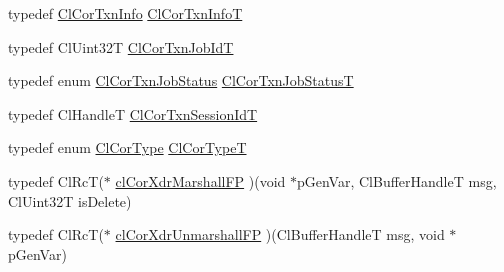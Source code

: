 \begin{CompactItemize}
\item 
typedef \hyperlink{struct_cl_cor_txn_info}{Cl\-Cor\-Txn\-Info} \hyperlink{group__group13_ga40}{Cl\-Cor\-Txn\-Info\-T}
\item 
typedef Cl\-Uint32T \hyperlink{group__group13_ga18}{Cl\-Cor\-Txn\-Job\-Id\-T}
\item 
typedef enum \hyperlink{group__group13_ga334}{Cl\-Cor\-Txn\-Job\-Status} \hyperlink{group__group13_ga19}{Cl\-Cor\-Txn\-Job\-Status\-T}
\item 
typedef Cl\-Handle\-T \hyperlink{group__group13_ga16}{Cl\-Cor\-Txn\-Session\-Id\-T}
\item 
typedef enum \hyperlink{group__group13_ga325}{Cl\-Cor\-Type} \hyperlink{group__group13_ga9}{Cl\-Cor\-Type\-T}
\item 
typedef Cl\-Rc\-T($\ast$ \hyperlink{group__group13_ga54}{cl\-Cor\-Xdr\-Marshall\-FP} )(void $\ast$p\-Gen\-Var, Cl\-Buffer\-Handle\-T msg, Cl\-Uint32T is\-Delete)
\item 
typedef Cl\-Rc\-T($\ast$ \hyperlink{group__group13_ga55}{cl\-Cor\-Xdr\-Unmarshall\-FP} )(Cl\-Buffer\-Handle\-T msg, void $\ast$p\-Gen\-Var)
\end{CompactItemize}
